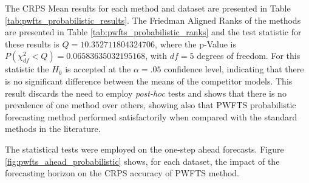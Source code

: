 The CRPS Mean results for each method and dataset are presented in Table \ref{tab:pwfts_probabilistic_results}. The Friedman Aligned Ranks of the methods are presented in Table \ref{tab:pwfts_probabilistic_ranks} and the test statistic for these results is $Q = 10.352711804324706$, where the p-Value is $P(\chi ^2_{df} < Q) = 0.06583635032195168$, with $df=5$ degrees of freedom. For this statistic the $H_0$ is accepted at the $\alpha = .05$ confidence level, indicating that there is no significant difference between the means of the competitor models. This result discards the need to employ \textit{post-hoc} tests and shows that there is no prevalence of one method over others, showing also that PWFTS probabilistic forecasting method performed satisfactorily when compared with the standard methods in the literature. 

The statistical tests were employed on the one-step ahead forecasts. Figure \ref{fig:pwfts_ahead_probabilistic} shows, for each dataset, the impact of the forecasting horizon on the CRPS accuracy of PWFTS method.

\begin{table}[htb]
    \caption{CRPS for one step ahead interval forecasts}
    \label{tab:pwfts_probabilistic_results}
\end{table}

